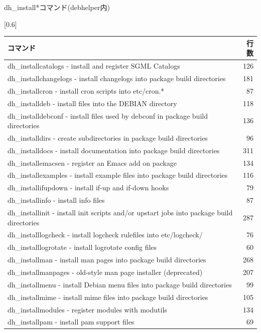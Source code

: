 \begin{frame}{dh\_install*コマンド(debhelper内)}
\begin{table}[htb]
\scalebox{0.6}[0.6]{
\begin{tabular}{|l|r|} \hline
コマンド & 行数 \\ \hline
dh\_installcatalogs - install and register SGML Catalogs & 126 \\ \hline
dh\_installchangelogs - install changelogs into package build directories & 181 \\ \hline
dh\_installcron - install cron scripts into etc/cron.* & 87 \\ \hline
dh\_installdeb - install files into the DEBIAN directory & 118 \\ \hline
dh\_installdebconf - install files used by debconf in package build directories & 136 \\ \hline
dh\_installdirs - create subdirectories in package build directories & 96 \\ \hline
dh\_installdocs - install documentation into package build directories & 311 \\ \hline
dh\_installemacsen - register an Emacs add on package & 134 \\ \hline
dh\_installexamples - install example files into package build directories & 116 \\ \hline
dh\_installifupdown - install if-up and if-down hooks & 79 \\ \hline
dh\_installinfo - install info files & 87 \\ \hline
dh\_installinit - install init scripts and/or upstart jobs into package build directories & 287 \\ \hline
dh\_installlogcheck - install logcheck rulefiles into etc/logcheck/ & 76 \\ \hline
dh\_installlogrotate - install logrotate config files & 60 \\ \hline
dh\_installman - install man pages into package build directories & 268 \\ \hline
dh\_installmanpages - old-style man page installer (deprecated) & 207 \\ \hline
dh\_installmenu - install Debian menu files into package build directories & 99 \\ \hline
dh\_installmime - install mime files into package build directories & 105 \\ \hline
dh\_installmodules - register modules with modutils & 134 \\ \hline
dh\_installpam - install pam support files & 69 \\ \hline

\end{tabular}}
\end{table}
\end{frame}
